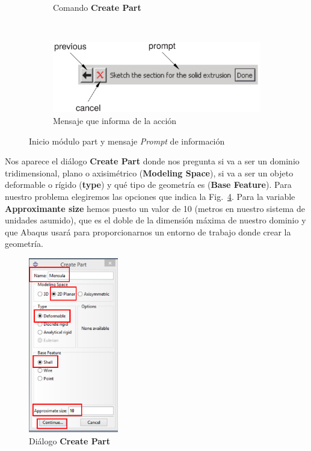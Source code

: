 \begin{enumerate}
\begin{figure}[H]
\begin{subfigure}{0.25\textwidth}
    \caption{Comando \textbf{Create Part}}
    \label{figu02}
  \end{subfigure}%
  ~ %
  \begin{subfigure}{0.65\textwidth}
    \includegraphics[width=\textwidth]{./body/images/imagen03}
    \caption{Mensaje que informa de la acción}
    \label{figu03}
  \end{subfigure}
  \caption{Inicio módulo part y mensaje \textit{Prompt} de
    información}
\end{figure}

Nos aparece el diálogo \textbf{Create Part} donde nos pregunta si va a
ser un dominio tridimensional, plano o axisimétrico (\textbf{Modeling
  Space}), si va a ser un objeto deformable o rígido (\textbf{type}) y
qué tipo de geometría es (\textbf{Base Feature}). Para nuestro
problema elegiremos las opciones que indica la Fig.~\ref{figu04}.
Para la variable \textbf{Approximante size} hemos puesto un valor de
10 (metros en nuestro sistema de unidades asumido), que es el doble de
la dimensión máxima de nuestro dominio y que Abaqus usará para
proporcionarnos un entorno de trabajo donde crear la geometría.
\begin{figure}[H]
  \begin{center}
    \includegraphics[width=0.35\textwidth]{./body/images/imagen04.pdf}
  \end{center}
  \caption{Diálogo \textbf{Create Part}}
  \label{figu04}
\end{figure}


\end{enumerate}

